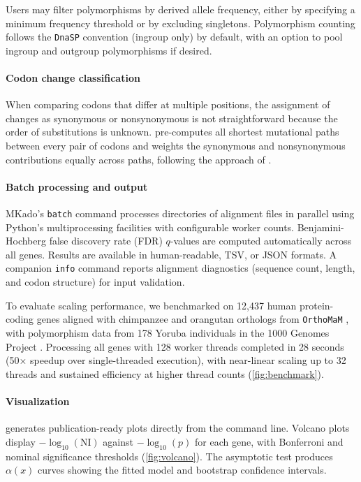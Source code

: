 Users may filter polymorphisms by derived allele frequency,
either by specifying a minimum frequency threshold
or by excluding singletons.
Polymorphism counting follows the \texttt{DnaSP} convention
(ingroup only) by default,
with an option to pool ingroup and outgroup polymorphisms if desired.

\paragraph{Codon change classification}
When comparing codons that differ at multiple positions,
the assignment of changes as synonymous or nonsynonymous
is not straightforward
because the order of substitutions is unknown.
\mkado pre-computes all shortest mutational paths
between every pair of codons
and weights the synonymous and nonsynonymous contributions
equally across paths,
following the approach of \citet{nei1986}.

\paragraph{Batch processing and output}
MKado's \texttt{batch} command processes directories of alignment files
in parallel using Python's multiprocessing facilities
with configurable worker counts.
Benjamini-Hochberg false discovery rate (FDR) $q$-values
are computed automatically across all genes.
Results are available in human-readable, TSV, or JSON formats.
A companion \texttt{info} command reports alignment diagnostics
(sequence count, length, and codon structure)
for input validation.

To evaluate scaling performance,
we benchmarked \mkado on 12,437 human protein-coding genes
aligned with chimpanzee and orangutan orthologs
from \texttt{OrthoMaM} \citep{orthomam2024},
with polymorphism data from 178 Yoruba individuals
in the 1000 Genomes Project \citep{1000genomes2015}.
Processing all genes with 128 worker threads
completed in 28 seconds
(50$\times$ speedup over single-threaded execution),
with near-linear scaling up to 32 threads
and sustained efficiency at higher thread counts
(\cref{fig:benchmark}).

\paragraph{Visualization}
\mkado generates publication-ready plots
directly from the command line.
Volcano plots display $-\log_{10}(\text{NI})$
against $-\log_{10}(p)$ for each gene,
with Bonferroni and nominal significance thresholds
(\cref{fig:volcano}).
The asymptotic test produces $\alpha(x)$ curves
showing the fitted model and bootstrap confidence intervals.

